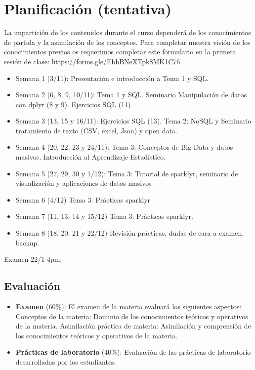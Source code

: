 \documentclass[
]{book}
\begin{document}
\hypertarget{planificaciuxf3n-tentativa}{%
\section{Planificación (tentativa)}\label{planificaciuxf3n-tentativa}}

La impartición de los contenidos durante el curso dependerá de los conocimientos de partida y la asimilación de los
conceptos. Para completar nuestra visión de los conocimientos previos os requerimos completar este formulario en la primera sesión de clase: \url{https://forms.gle/EbbBNeXTpk8MK1C76}

\begin{itemize}
\item
  Semana 1 (3/11): Presentación e introducción a Tema 1 y SQL.
\item
  Semana 2 (6, 8, 9, 10/11): Tema 1 y SQL. Seminario Manipulación de datos con dplyr (8 y 9). Ejercicios SQL (11)
\item
  Semana 3 (13, 15 y 16/11): Ejercicios SQL (13). Tema 2: NoSQL y Seminario tratamiento de texto (CSV, excel, Json) y open data.
\item
  Semana 4 (20, 22, 23 y 24/11): Tema 3: Conceptos de Big Data y datos masivos. Introducción al Aprendizaje Estadístico.
\item
  Semana 5 (27, 29, 30 y 1/12): Tema 3: Tutorial de sparklyr, seminario de visualización y aplicaciones de datos masivos
\item
  Semana 6 (4/12) Tema 3: Prácticas sparklyr
\item
  Semana 7 (11, 13, 14 y 15/12) Tema 3: Prácticas sparklyr.
\item
  Semana 8 (18, 20, 21 y 22/12) Revisión prácticas, dudas de cara a examen, backup.
\end{itemize}

Examen 22/1 4pm.

\hypertarget{evaluaciuxf3n}{%
\subsection{Evaluación}\label{evaluaciuxf3n}}

\begin{itemize}
\item
  \textbf{Examen} (60\%): El examen de la materia evaluará los siguientes aspectos:
  Conceptos de la materia: Dominio de los conocimientos teóricos y operativos de la materia.
  Asimilación práctica de materia: Asimilación y comprensión de los conocimientos teóricos y operativos de la materia.
\item
  \textbf{Prácticas de laboratorio} (40\%): Evaluación de las prácticas de laboratorio desarrolladas por los estudiantes.
\end{itemize}
\end{document}
